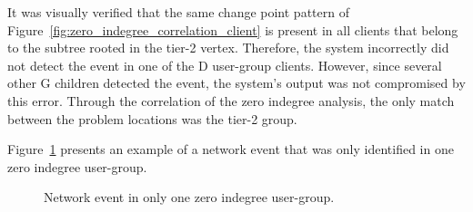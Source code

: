 It was visually verified that the same change point pattern of
Figure~\ref{fig:zero_indegree_correlation_client} is present in all clients
that belong to the subtree rooted in the tier-2 vertex.
Therefore, the system incorrectly did not detect the event in one of the D
user-group clients.
However, since several other G children detected the
event, the system's output was not compromised by this error.
Through the correlation of the zero indegree analysis,
the only match between the problem locations was the tier-2 group.

Figure~\ref{fig:zero_indegreee_without_correlation} presents an example of a
network event that was only identified in one zero indegree user-group.

\begin{figure}[H]
    \centering
    \caption{Network event in only one zero indegree user-group.}
\label{fig:zero_indegreee_without_correlation}
\end{figure}%

